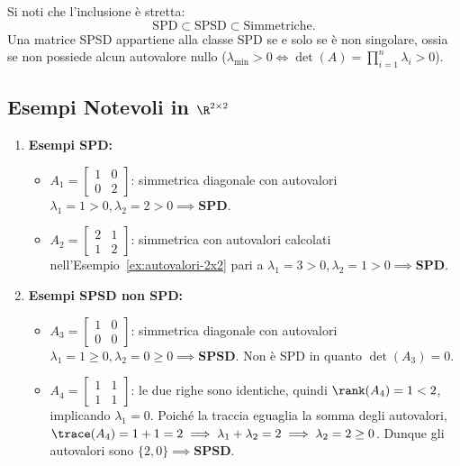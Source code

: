 Si noti che l'inclusione \`e stretta:
\begin{equation}
    \text{SPD} \subset \text{SPSD} \subset \text{Simmetriche}.
\end{equation}
Una matrice SPSD appartiene alla classe SPD se e solo se \`e non singolare, ossia se non possiede alcun autovalore nullo ($\lambda_{\min} > 0 \iff \det(A) = \prod_{i=1}^n \lambda_i > 0$).

\subsection{Esempi Notevoli in \texorpdfstring{$\R^{2 \times 2}$}{R\textasciicircum(2x2)}}

\begin{example}
\mbox{}\par\nopagebreak
\begin{enumerate}
    \item \textbf{Esempi SPD:}
    \begin{itemize}
        \item $A_1 = \begin{bmatrix} 1 & 0 \\ 0 & 2 \end{bmatrix}$: simmetrica diagonale con autovalori $\lambda_1 = 1 > 0, \lambda_2 = 2 > 0 \implies \mathbf{SPD}$.
        \item $A_2 = \begin{bmatrix} 2 & 1 \\ 1 & 2 \end{bmatrix}$: simmetrica con autovalori calcolati nell'Esempio~\ref{ex:autovalori-2x2} pari a $\lambda_1 = 3 > 0, \lambda_2 = 1 > 0 \implies \mathbf{SPD}$.
    \end{itemize}
    \item \textbf{Esempi SPSD non SPD:}
    \begin{itemize}
        \item $A_3 = \begin{bmatrix} 1 & 0 \\ 0 & 0 \end{bmatrix}$: simmetrica diagonale con autovalori $\lambda_1 = 1 \ge 0, \lambda_2 = 0 \ge 0 \implies \mathbf{SPSD}$. Non \`e SPD in quanto $\det(A_3) = 0$.
        \item $A_4 = \begin{bmatrix} 1 & 1 \\ 1 & 1 \end{bmatrix}$: le due righe sono identiche, quindi $\rank(A_4) = 1 < 2$, implicando $\lambda_1 = 0$. Poich\'e la traccia eguaglia la somma degli autovalori, $\trace(A_4) = 1 + 1 = 2 \implies \lambda_1 + \lambda_2 = 2 \implies \lambda_2 = 2 \ge 0$. Dunque gli autovalori sono $\{2, 0\} \implies \mathbf{SPSD}$.

\end{itemize}
\end{enumerate}
\end{example}
